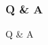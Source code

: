 \documentclass{beamer}
\begin{document}

\begin{frame}
	\frametitle{Q \& A}
	\center \huge		Q \& A
\end{frame}








\end{document}
